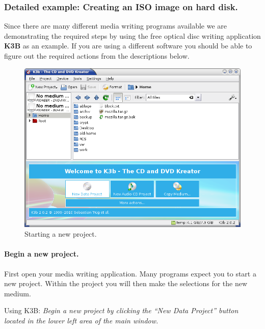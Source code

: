 \newpage
\subsubsection{Detailed example: Creating an ISO image on hard disk.}
\label{howto-augment-make-iso}

Since there are many different media writing programs available we are
demonstrating the required steps by using the free optical disc writing
application {\bf K3B} as an example. If you are using a different software
you should be able to figure out the required actions from the descriptions below.

\begin{figure}[h]
\centerline{\includegraphics[width=\textwidth]{screenshots/make-iso1.png}}
\caption{Starting a new project.}  
\label{howto-augment-make-iso-new-project}
\end{figure}

\paragraph{Begin a new project.} First open your media
writing application. Many programs expect you to start a new project.
Within the project you will then make the selections for the new medium.

\bigskip

Using K3B: {\em Begin a new project by clicking the ``New Data Project''
  button located in the lower left area of the main window.} 

